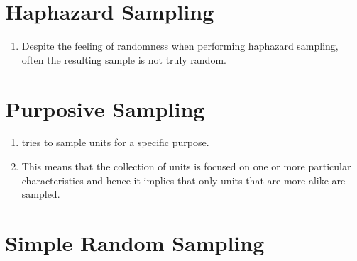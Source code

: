 \section{Haphazard Sampling \cite{ism-1}}
\label{Haphazard Sampling}

\begin{enumerate}
    \item Despite the feeling of randomness when performing haphazard sampling, often the resulting sample is not truly random.

\end{enumerate}


\section{Purposive Sampling \cite{ism-1}}\label{Purposive Sampling}

\begin{enumerate}
    \item tries to sample units for a specific purpose. 

    \item This means that the collection of units is focused on one or more particular characteristics and hence it implies that only units that are more alike are sampled.
\end{enumerate}


\section{Simple Random Sampling \cite{ism-1}}\label{Simple Random Sampling}

